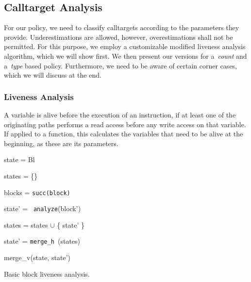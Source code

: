 \subsection{Calltarget Analysis}
\label{section:calltargetanalysis}
For our policy, we need to classify calltargets according to the parameters they provide. Underestimations are allowed, however, overestimations 
shall not be permitted. For this purpose, we employ a customizable modified liveness analysis algorithm, which we will show first. 
We then present our versions for a~\emph{count} and a~\emph{type} based policy. Furthermore, we need to be aware of certain corner cases,
which we will discuss at the end.

\subsubsection{Liveness Analysis}
A variable is alive before the execution of an instruction, if at least one of the originating paths performs a read access before any write access on that variable. 
If applied to a function, this calculates the variables that need to be alive at the beginning, as these are its parameters. 

\begin{algorithm}[h!]
 	\SetAlgoLined
        \BlankLine
	{
 	state = Bl                                                  
 	

	states = \{\}                                               
	
	blocks = \texttt{succ(block)}                                        
	
	 {
	
 		state' = \texttt{ analyze}(block') 
 		
		states = states $\cup$ \{ state' \} 
	}

	state' = \texttt{merge\_h }(states)	

	\Return merge\_v(state, state')                             

	}
\caption{Basic block liveness analysis.}
\label{alg:liveness}
\end{algorithm}

